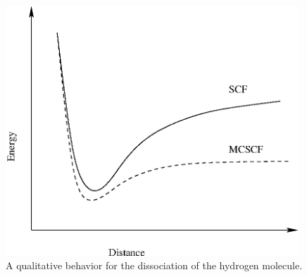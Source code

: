 \begin{center}
\begin{figure}[ht]
\begin{center}
\includegraphics[width=11cm]{01_introduction/images/hydrogen.eps}
\end{center}
\caption{\footnotesize A qualitative behavior for the dissociation of the hydrogen
molecule.}
\label{fig:hydrogen}
\end{figure}
\end{center}
